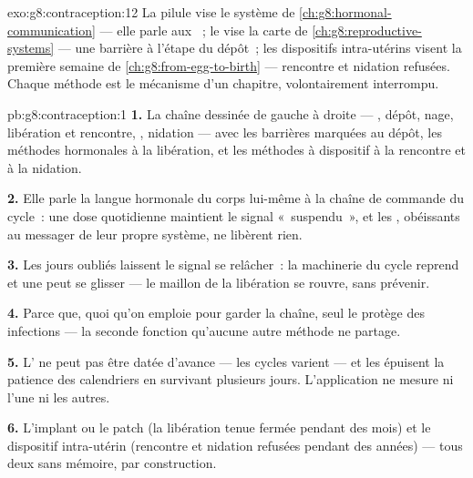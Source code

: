 \begin{solution}{exo:g8:contraception:12}
La pilule vise le système de
\cref{ch:g8:hormonal-communication} --- elle parle  aux
~; le  vise la carte de
\cref{ch:g8:reproductive-systems} --- une barrière à l'étape du
dépôt~; les dispositifs intra-utérins visent la première semaine de
\cref{ch:g8:from-egg-to-birth} --- rencontre et nidation refusées.
Chaque méthode est le mécanisme d'un chapitre, volontairement
interrompu.
\end{solution}

\begin{solution}{pb:g8:contraception:1}
\textbf{1.} La chaîne dessinée de gauche à droite --- ,
dépôt, nage, libération et rencontre, , nidation --- avec
les barrières marquées au dépôt, les méthodes hormonales à la
libération, et les méthodes à dispositif à la rencontre et à la
nidation.

\textbf{2.} Elle parle la langue hormonale du corps lui-même à la
chaîne de commande du cycle~: une dose quotidienne maintient le
signal «~suspendu~», et les , obéissants au messager de leur
propre système, ne libèrent rien.

\textbf{3.} Les jours oubliés laissent le signal se relâcher~: la
machinerie du cycle reprend et une  peut se glisser --- le
maillon de la libération se rouvre, sans prévenir.

\textbf{4.} Parce que, quoi qu'on emploie pour garder la chaîne,
seul le  protège des infections --- la seconde fonction
qu'aucune autre méthode ne partage.

\textbf{5.} L' ne peut pas être datée d'avance --- les
cycles varient --- et les  épuisent la patience des
calendriers en survivant plusieurs jours. L'application ne mesure ni
l'une ni les autres.

\textbf{6.} L'implant ou le patch (la libération tenue fermée
pendant des mois) et le dispositif intra-utérin (rencontre et
nidation refusées pendant des années) --- tous deux sans mémoire, par
construction.


\end{solution}
